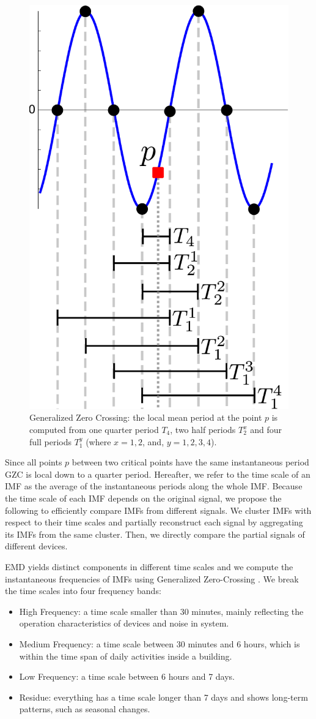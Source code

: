 \begin{figure}
\begin{center}
 \includegraphics[width=.25\textwidth]{figs/gzc.pdf}
 \end{center}
 \caption{Generalized Zero Crossing: the local mean period at the point $p$ is computed from one quarter period $T_4$, two half periods $T_2^x$ and four full periods $T_1^y$ (where $x=1, 2$, and, $y=1,2,3,4$).}
 \label{fig:gzc}
\end{figure}

Since all points $p$ between two critical points have the same instantaneous period GZC is local down to a quarter period.
Hereafter, we refer to the time scale of an IMF as the average of the instantaneous periods along the whole IMF.
Because the time scale of each IMF depends on the original signal, we propose the following to efficiently compare IMFs from different signals.
We cluster IMFs with respect to their time scales and partially reconstruct each signal by aggregating its IMFs from the 
same cluster.  Then, we directly compare the partial signals of different devices.

EMD yields distinct components in different time scales and we compute the instantaneous frequencies \cite{IF} of IMFs using Generalized Zero-Crossing \cite{GZC}.  We break the time scales into four frequency bands:
\begin{itemize}
\item High Frequency: a time scale smaller than 30 minutes, mainly reflecting the operation characteristics of devices and noise in system. 
\item Medium Frequency: a time scale between 30 minutes and 6 hours, which is within the time span of daily activities inside a building.
\item Low Frequency: a time scale between 6 hours and 7 days. %
\item Residue: everything has a time scale longer than 7 days and shows long-term patterns, such as seasonal changes.
\end{itemize}

